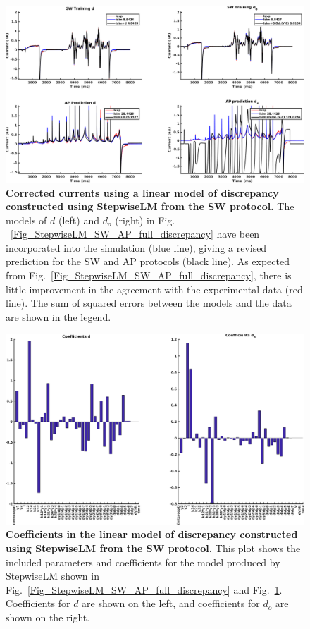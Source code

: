 \documentclass[11pt,a4paper,oneside]{article}
\begin{document}
\begin{figure}[hb]
\begin{center}
\includegraphics[scale=0.42]{Figures/StepwiseLM_SW_AP_full_currents.png}
\caption{\textbf{Corrected currents using a linear model of discrepancy constructed using StepwiseLM from the SW protocol.} The models of $d$ (left) and $d_o$ (right) in Fig. ~\ref{Fig_StepwiseLM_SW_AP_full_discrepancy} have been incorporated into the simulation (blue line), giving a revised prediction for the SW and AP protocols (black line). As expected from Fig.~\ref{Fig_StepwiseLM_SW_AP_full_discrepancy}, there is little improvement in the agreement with the experimental data (red line). The sum of squared errors between the models and the data are shown in the legend.}
\label{Fig_StepwiseLM_SW_AP_full_currents}
\end{center}
\end{figure}

\begin{figure}[t]
\begin{center}
\includegraphics[scale=0.42]{Figures/StepwiseLM_SW_AP_full_coefficients.png}
\caption{\textbf{Coefficients in the linear model of discrepancy constructed using StepwiseLM from the SW protocol.} This plot shows the included parameters and coefficients for the model produced by StepwiseLM shown in Fig.~\ref{Fig_StepwiseLM_SW_AP_full_discrepancy} and Fig.~\ref{Fig_StepwiseLM_SW_AP_full_currents}. Coefficients for $d$ are shown on the left, and coefficients for $d_o$ are shown on the right.} 
\label{Fig_StepwiseLM_SW_AP_coefficients}
\end{center}
\end{figure}
\end{document}
